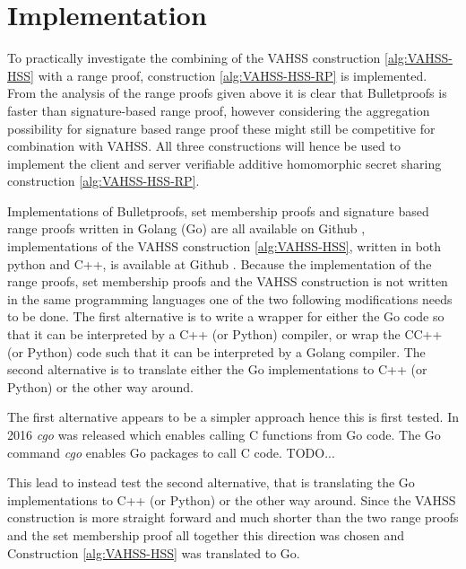 \section{Implementation}
To practically investigate the combining of the VAHSS construction \ref{alg:VAHSS-HSS} with a range proof, construction \ref{alg:VAHSS-HSS-RP} is implemented. %
 From the analysis of the range proofs given above it is clear that Bulletproofs is faster than signature-based range proof, however considering the aggregation possibility for signature based range proof these might still be competitive for combination with VAHSS.  All three constructions will hence be used to implement the client and server verifiable additive homomorphic secret sharing construction \ref{alg:VAHSS-HSS-RP}. 

Implementations of Bulletproofs, set membership proofs and signature based range proofs written in Golang (Go) are all available on Github \cite{Git:RP}, implementations of the VAHSS construction \ref{alg:VAHSS-HSS}, written in both python and C++, is available at Github \cite{Git:python_vahss} \cite{Git:C_vahss}.
Because the implementation of the range proofs, set membership proofs and the VAHSS construction is not written in the same programming languages one of the two following modifications needs to be done. The first alternative is to write a wrapper for either the Go code so that it can be interpreted by a C++ (or Python) compiler, or wrap the CC++ (or Python) code such that it can be interpreted by a Golang compiler. The second alternative is to translate either the Go implementations to C++ (or Python) or the other way around. 

The first alternative appears to be a simpler approach hence this is first tested. In 2016 \textit{cgo} was released which enables calling C functions from Go code. 
The Go command \textit{cgo} enables Go packages to call C code. TODO...

This lead to instead test the second alternative, that is translating  the Go implementations to C++ (or Python) or the other way around. Since the VAHSS construction is more straight forward and much shorter than the two range proofs and the set membership proof all together this direction was chosen and Construction \ref{alg:VAHSS-HSS} was translated to Go.

